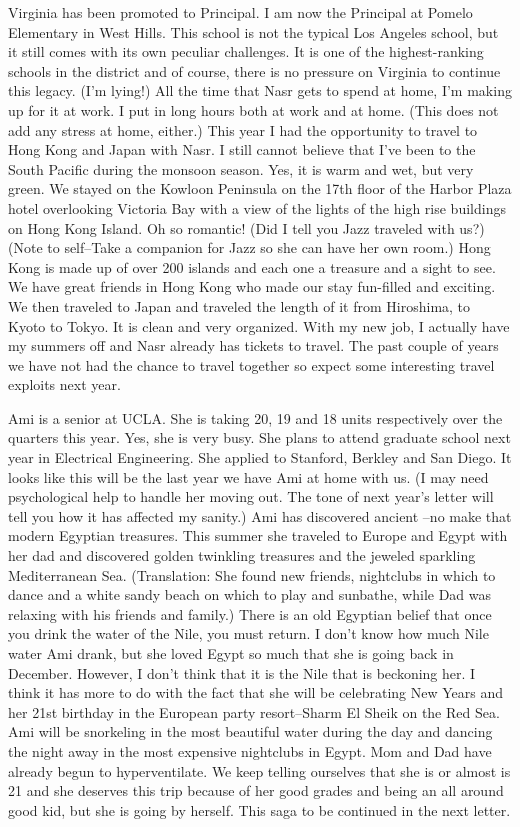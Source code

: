 Virginia has been promoted to Principal.  I am now the Principal at Pomelo Elementary in West Hills. This school is not the typical Los Angeles
school, but it still comes with its own peculiar challenges.  It is one of the highest-ranking schools in the district and of course, there is
no pressure on Virginia to continue this legacy.  (I'm lying!)  All the time that Nasr gets to spend at home, I'm making up for it at work.  I
put in long hours both at work and at home.  (This does not add any stress at home, either.)  This year I had the opportunity to travel to Hong
Kong and Japan with Nasr.  I still cannot believe that I've been to the South Pacific during the monsoon season.  Yes, it is warm and wet, but
very green.  We stayed on the Kowloon Peninsula on the 17th floor of the Harbor Plaza hotel overlooking Victoria Bay with a view of the lights
of the high rise buildings on Hong Kong Island.  Oh so romantic!  (Did I tell you Jazz traveled with us?) (Note to self--Take a companion for
Jazz so she can have her own room.)  Hong Kong is made up of over 200 islands and each one a treasure and a sight to see.  We have great friends
in Hong Kong who made our stay fun-filled and exciting.   We then traveled to Japan and traveled the length of it from Hiroshima, to Kyoto to
Tokyo.  It is clean and very organized.  With my new job, I actually have my summers off and Nasr already has tickets to travel.  The past
couple of years we have not had the chance to travel together so expect some interesting travel exploits next year.

Ami is a senior at UCLA.  She is taking 20, 19 and 18 units respectively over the quarters this year.  Yes, she is very busy.  She plans to
attend graduate school next year in Electrical Engineering.   She applied to Stanford, Berkley and San Diego.  It looks like this will be the
last year we have Ami at home with us.  (I may need psychological help to handle her moving out.  The tone of next year's letter will tell you
how it has affected my sanity.)  Ami has discovered ancient --no make that modern Egyptian treasures.   This summer she traveled to Europe and
Egypt with her dad and discovered golden twinkling treasures and the jeweled sparkling Mediterranean Sea.  (Translation:  She found new friends,
nightclubs in which to dance and a white sandy beach on which to play and sunbathe, while Dad was relaxing with his friends and family.)  There
is an old Egyptian belief that once you drink the water of the Nile, you must return.  I don't know how much Nile water Ami drank, but she loved
Egypt so much that she is going back in December.  However, I don't think that it is the Nile that is beckoning her.  I think it has more to do
with the fact that she will be celebrating New Years and her 21st birthday in the European party resort--Sharm El Sheik on the Red Sea.  Ami
will be snorkeling in the most beautiful water during the day and dancing the night away in the most expensive nightclubs in Egypt.  Mom and Dad
have already begun to hyperventilate.  We keep telling ourselves that she is or almost is 21 and she deserves this trip because of her good
grades and being an all around good kid, but she is going by herself.  This saga to be continued in the next letter.

